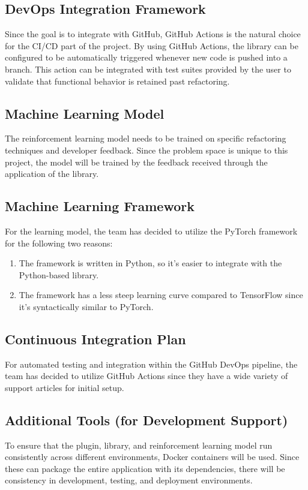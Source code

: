 \documentclass{article}
\begin{document}
\subsection{DevOps Integration Framework}
Since the goal is to integrate with GitHub, GitHub Actions is the
natural choice for the CI/CD part of the project. By using GitHub
Actions, the library can be configured to be automatically triggered
whenever new code is pushed into a branch. This action can be
integrated with test suites provided by the user to validate that
functional behavior is retained past refactoring.

\subsection{Machine Learning Model}
The reinforcement learning model needs to be trained on specific
refactoring techniques and developer feedback. Since the problem
space is unique to this project, the model will be trained by the
feedback received through the application of the library.

\subsection{Machine Learning Framework}
For the learning model, the team has decided to utilize the PyTorch
framework for the following two reasons:
\begin{enumerate}
  \item The framework is written in Python, so it's easier to
    integrate with the Python-based library.
  \item The framework has a less steep learning curve compared to
    TensorFlow since it’s syntactically similar to PyTorch.
\end{enumerate}

\subsection{Continuous Integration Plan}
For automated testing and integration within the GitHub DevOps
pipeline, the team has decided to utilize GitHub Actions since they
have a wide variety of support articles for initial setup.

\subsection{Additional Tools (for Development Support)}
To ensure that the plugin, library, and reinforcement learning model
run consistently across different environments, Docker containers
will be used. Since these can package the entire application with its
dependencies, there will be consistency in development, testing, and
deployment environments.
\end{document}
